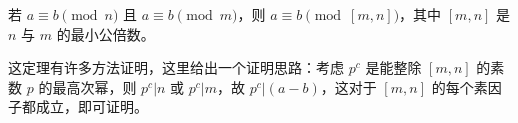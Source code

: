 \begin{theorem}{}
若 $a \equiv b \pmod n$ 且 $a \equiv b \pmod m$，则 $a \equiv b \pmod{[m, n]}$，其中 $[m, n]$ 是 $n$ 与 $m$ 的最小公倍数。
\end{theorem}
这定理有许多方法证明，这里给出一个证明思路：考虑 $p^c$ 是能整除 $[m, n]$ 的素数 $p$ 的最高次幂，则 $p^c | n$ 或 $p^c | m$，故 $p^c | (a - b)$，这对于 $[m, n]$ 的每个素因子都成立，即可证明。
